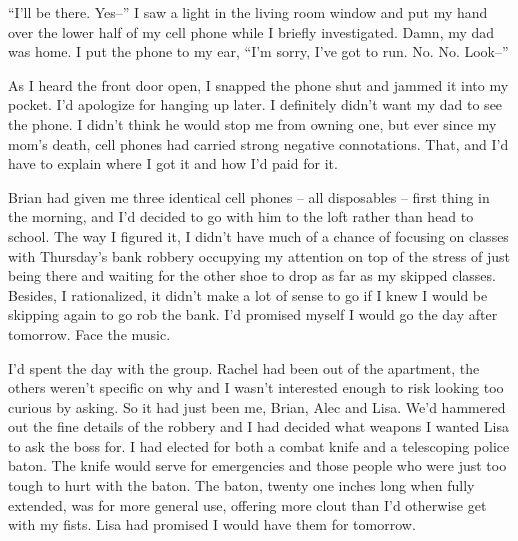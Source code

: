 





``I'll be there.  Yes--'' I saw a light in the living room window and put my hand over the lower half of my cell phone while I briefly investigated.  Damn, my dad was home.  I put the phone to my ear, ``I'm sorry, I've got to run.  No.  No.  Look--''



As I heard the front door open, I snapped the phone shut and jammed it into my pocket.  I'd apologize for hanging up later.  I definitely didn't want my dad to see the phone.  I didn't think he would stop me from owning one, but ever since my mom's death, cell phones had carried strong negative connotations.  That, and I'd have to explain where I got it and how I'd paid for it.



Brian had given me three identical cell phones – all disposables – first thing in the morning, and I'd decided to go with him to the loft rather than head to school.  The way I figured it, I didn't have much of a chance of focusing on classes with Thursday's bank robbery occupying my attention on top of the stress of just being there and waiting for the other shoe to drop as far as my skipped classes.  Besides, I rationalized, it didn't make a lot of sense to go if I knew I would be skipping again to go rob the bank.  I'd promised myself I would go the day after tomorrow.  Face the music.



I'd spent the day with the group.  Rachel had been out of the apartment, the others weren't specific on why and I wasn't interested enough to risk looking too curious by asking.  So it had just been me, Brian, Alec and Lisa.  We'd hammered out the fine details of the robbery and I had decided what weapons I wanted Lisa to ask the boss for.  I had elected for both a combat knife and a telescoping police baton.  The knife would serve for emergencies and those people who were just too tough to hurt with the baton.  The baton, twenty one inches long when fully extended, was for more general use, offering more clout than I'd otherwise get with my fists.  Lisa had promised I would have them for tomorrow.




